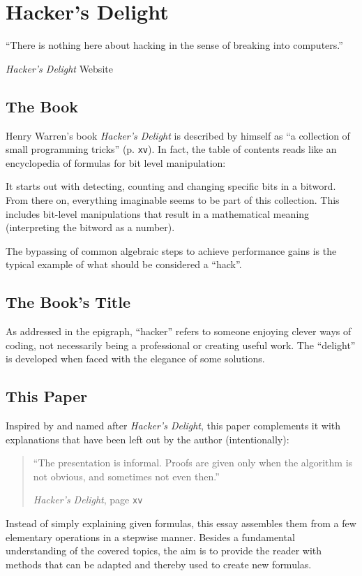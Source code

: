 \section{Hacker's Delight}\label{sec:book}
\epigraph{
``There is nothing here about hacking
in the sense of breaking into computers.''
}{
\emph{Hacker's Delight} Website
\cite{Warren:HD:Website}
}


\subsection*{The Book}
Henry Warren's book \emph{Hacker's Delight}
is described by himself as
``a collection of small programming tricks''
\cite{Warren:2012:HD:2462741} (p. \texttt{xv}).
In fact, the table of contents reads like
an encyclopedia of formulas for bit level manipulation:

It starts out with detecting, counting and changing
specific bits in a bitword.
From there on, everything imaginable seems to be part of this collection.
This includes bit-level manipulations that result
in a mathematical meaning (interpreting the bitword as a number).

The bypassing of common algebraic steps
to achieve performance gains is the typical example
of what should be considered a ``hack''.


\subsection*{The Book's Title}
As addressed in the epigraph, ``hacker'' refers to
someone enjoying clever ways of coding,
not necessarily being a professional
or creating useful work.
The ``delight'' is developed when faced with the elegance of some solutions.


\subsection*{This Paper}
Inspired by and named after \emph{Hacker's Delight},
this paper complements it with explanations
that have been left out by the author (intentionally):

\begin{quote}
``The presentation is informal.
Proofs are given only when the algorithm is not obvious,
and sometimes not even then.''
\par\hfill \emph{Hacker's Delight},
page \texttt{xv} \cite{Warren:2012:HD:2462741}
\end{quote}

Instead of simply explaining given formulas,
this essay assembles them from a few elementary operations
in a stepwise manner.
Besides a fundamental understanding of the covered topics,
the aim is to provide the reader with methods
that can be adapted and thereby used to create new formulas.
